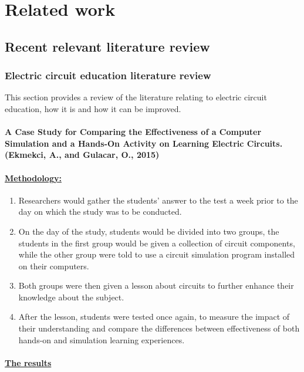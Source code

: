 \documentclass[../main.tex]{subfiles}
\begin{document}
\chapter{Related work}
\section{Recent relevant literature review}
\subsection{ Electric circuit education literature review}

This section provides a review of the literature relating to electric circuit education, how it is and how it can be improved.
\subsubsection{A Case Study for Comparing the Effectiveness of a Computer Simulation and a Hands-On Activity on Learning Electric Circuits. (Ekmekci, A., and Gulacar, O., 2015)
}

\subsubsection*{\underline{Methodology:}}

\begin{enumerate}
    \item Researchers would gather the students’ answer to the test a week prior to the day on which the study was to be conducted.
    \item On the day of the study, students would be divided into two groups, the students in the first group would be given a collection of circuit components, while the other group were told to use a circuit simulation program installed on their computers.
    \item Both groups were then given a lesson about circuits to further enhance their knowledge about the subject.
    \item After the lesson, students were tested once again, to measure the impact of their understanding and compare the differences between effectiveness of both hands-on and simulation learning experiences. 
\end{enumerate}
\subsubsection*{\underline{The results}} 
\end{document}
